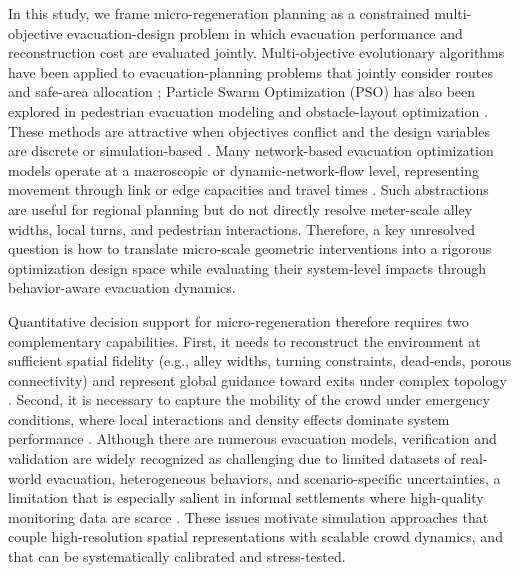 \documentclass[preprint,12pt]{elsarticle}
\begin{document}
In this study, we frame micro-regeneration planning as a constrained multi-objective evacuation-design problem in which evacuation performance and reconstruction cost are evaluated jointly.
Multi-objective evolutionary algorithms have been applied to evacuation-planning problems that jointly consider routes and safe-area allocation \citep{Saadatseresht2009MOEA,yang2025}; Particle Swarm Optimization (PSO) has also been explored in pedestrian evacuation modeling and obstacle-layout optimization \citep{Zheng2012PSOEvacuation,CristianiPeri2017Obstacles}. These methods are attractive when objectives conflict and the design variables are discrete or simulation-based \citep{Deb2002NSGA2}.
Many network-based evacuation optimization models operate at a macroscopic or dynamic-network-flow level, representing movement through link or edge capacities and travel times \citep{Bayram2016EvacuationReview,AalamiKattan2020}. Such abstractions are useful for regional planning but do not directly resolve meter-scale alley widths, local turns, and pedestrian interactions.
Therefore, a key unresolved question is how to translate micro-scale geometric interventions into a rigorous optimization design space while evaluating their system-level impacts through behavior-aware evacuation dynamics.

Quantitative decision support for micro-regeneration therefore requires two complementary capabilities.
First, it needs to reconstruct the environment at sufficient spatial fidelity (e.g., alley widths, turning constraints, dead-ends, porous connectivity) and represent global guidance toward exits under complex topology \citep{CovaChurch1997EvacuationGIS,Khatib1986PotentialField,Dijkstra1959,Sethian1996FastMarching}.
Second, it is necessary to capture the mobility of the crowd under emergency conditions, where local interactions and density effects dominate system performance \citep{Helbing1995SocialForce,Hughes2002ContinuumPedestrians,Treuille2006ContinuumCrowds}.
Although there are numerous evacuation models, verification and validation are widely recognized as challenging due to limited datasets of real-world evacuation, heterogeneous behaviors, and scenario-specific uncertainties, a limitation that is especially salient in informal settlements where high-quality monitoring data are scarce \citep{Ronchi2016VVEvacuationModels}.
These issues motivate simulation approaches that couple high-resolution spatial representations with scalable crowd dynamics, and that can be systematically calibrated and stress-tested.
\end{document}
